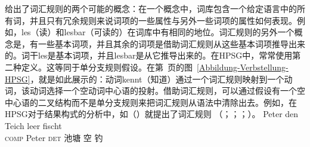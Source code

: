  \citet{Jackendoff75a}给出了词汇规则的两个可能的概念：在一个概念中，词库包含一个给定语言中的所有词，并且只有冗余规则来说词项的一些属性与另外一些词项的属性如何表现。例如，les（读）和lesbar（可读的）在词库中有相同的地位。词汇规则的另外一个概念是，有一些基本词项，并且其余的词项是借助词汇规则从这些基本词项推导出来的。词干les是基本词项，并且lesbar是从它推导出来的。在HPSG中，常常使用第二种定义。这等同于单分支规则假设。在第~\pageref{Abbildung-Verbstellung-HPSG}页的图~\ref{Abbildung-Verbstellung-HPSG}，就是如此展示的：动词kennt（知道）通过一个词汇规则映射到一个动词，该动词选择一个空动词中心语的投射。借助词汇规则，可以通过假设有一个空中心语的二叉结构而不是单分支规则来把词汇规则从语法中清除出去。例如，在HPSG对于结果构式的分析中，如（）就提出了词汇规则 （\citealp{Verspoor97a}；\citealp{Wechsler97a}；\citealp{WN2001a}；\citealp[\S~5]{Mueller2002b}）。
\ea
\gll [dass] Peter den Teich leer fischt\\
	 \spacebr{}\textsc{comp} Peter \textsc{det} 池塘 空 钓\\
